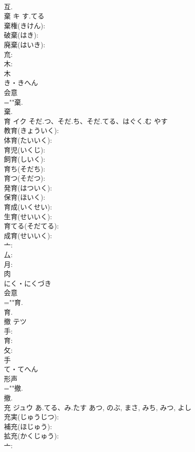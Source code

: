 \documentclass[8pt]{extreport}
\begin{document}
\begin{CJK}{UTF8}{min}
\\	互.
\\	棄	キ	す.てる		
\\	棄権(きけん): 
\\	破棄(はき): 
\\	廃棄(はいき): 
\\	㐬: 
\\	木: 
\\	木	
\\	き・きへん	
\\	会意 
\\	=""棄.
\\	棄.
\\	育	イク	そだ.つ、そだ.ち、そだ.てる、はぐく.む	やす	
\\	教育(きょういく): 
\\	体育(たいいく): 
\\	育児(いくじ): 
\\	飼育(しいく): 
\\	育ち(そだち): 
\\	育つ(そだつ): 
\\	発育(はついく): 
\\	保育(ほいく): 
\\	育成(いくせい): 
\\	生育(せいいく): 
\\	育てる(そだてる): 
\\	成育(せいいく): 
\\	亠: 
\\	厶: 
\\	月: 
\\	肉	
\\	にく・にくづき	
\\	会意 
\\	=""育.
\\	育.
\\	撤	テツ			
\\	手: 
\\	育: 
\\	攵: 
\\	手	
\\	て・てへん	
\\	形声 
\\	=""撤.
\\	撤.
\\	充	ジュウ	あ.てる、み.たす	あつ, のぶ, まさ, みち, みつ, よし	
\\	充実(じゅうじつ): 
\\	補充(ほじゅう): 
\\	拡充(かくじゅう): 
\\	亠: 

\end{CJK}
\end{document}
